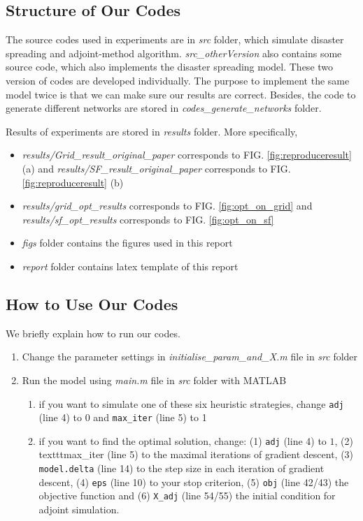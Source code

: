 
\subsection{Structure of Our Codes}
The source codes used in experiments are in \emph{src} folder, which simulate disaster spreading and adjoint-method algorithm. \emph{src\_otherVersion} also contains some source code, which also implements the disaster spreading model. These two version of codes are developed individually. The purpose to implement the same model twice is that we can make sure our results are correct. Besides, the code to generate different networks are stored in \emph{codes\_generate\_networks} folder.

Results of experiments are stored in \emph{results} folder. More specifically, 

\begin{itemize}
	\item \emph{results/Grid\_result\_original\_paper} corresponds to FIG. \ref{fig:reproduceresult} (a) and \emph{results/SF\_result\_original\_paper} corresponds to FIG. \ref{fig:reproduceresult} (b)
	\item \emph{results/grid\_opt\_results} corresponds to FIG. \ref{fig:opt_on_grid} and \emph{results/sf\_opt\_results} corresponds to FIG. \ref{fig:opt_on_sf}
	\item \emph{figs} folder contains the figures used in this report
	\item \emph{report} folder contains latex template of this report
\end{itemize}

\subsection{How to Use Our Codes}
We briefly explain how to run our codes.

\begin{enumerate}
	\item Change the parameter settings in \emph{initialise\_param\_and\_X.m} file in \emph{src} folder
	\item Run the model using \emph{main.m} file in \emph{src} folder with MATLAB
	\begin{enumerate}
		\item if you want to simulate one of these six heuristic strategies, change \texttt{adj} (line 4) to $0$ and \texttt{max\_iter} (line 5) to 1
		\item if you want to find the optimal solution, change: (1) \texttt{adj} (line 4) to $1$, (2) texttt{max\_iter} (line 5) to the maximal iterations of gradient descent, (3) \texttt{model.delta} (line 14) to the step size in each iteration of gradient descent, (4) \texttt{eps} (line 10) to your stop criterion, (5) \texttt{obj} (line 42/43) the objective function and (6) \texttt{X\_adj} (line 54/55) the initial condition for adjoint simulation.
	\end{enumerate}
\end{enumerate}